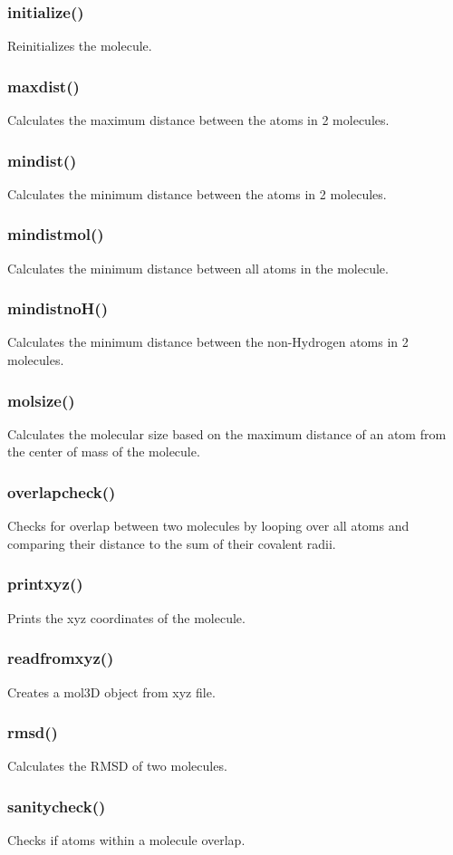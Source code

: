 \documentclass[a4paper,12pt]{assignment}
\begin{document}
\subsubsection{initialize()}
Reinitializes the molecule.
\subsubsection{maxdist()}
Calculates the maximum distance between the atoms in 2 molecules.
\subsubsection{mindist()}
Calculates the minimum distance between the atoms in 2 molecules.
\subsubsection{mindistmol()}
Calculates the minimum distance between all atoms in the molecule.
\subsubsection{mindistnoH()}
Calculates the minimum distance between the non-Hydrogen atoms in 2 molecules.
\subsubsection{molsize()}
Calculates the molecular size based on the maximum distance of an atom from the center of mass of the molecule.
\subsubsection{overlapcheck()}
Checks for overlap between two molecules by looping over all atoms and comparing their distance to the sum of their covalent radii.
\subsubsection{printxyz()}
Prints the xyz coordinates of the molecule.
\subsubsection{readfromxyz()}
Creates a mol3D object from xyz file.
\subsubsection{rmsd()}
Calculates the RMSD of two molecules.
\subsubsection{sanitycheck()}
Checks if atoms within a molecule overlap.
\end{document}
